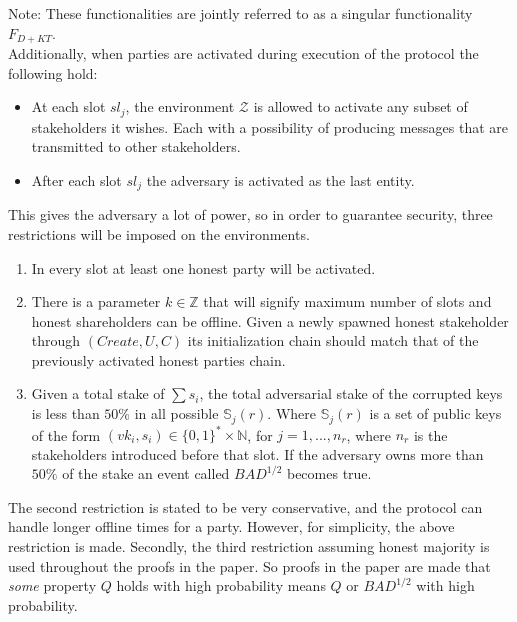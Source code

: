 Note: These functionalities are jointly referred to as a singular functionality $F_{D+KT}$.\\

Additionally, when parties are activated during execution of the protocol the following hold:

\begin{itemize}
    \item At each slot $sl_j$, the environment $\mathcal{Z}$ is allowed to activate any subset of stakeholders it wishes. Each with a possibility of producing messages that are transmitted to other stakeholders. 
    \item After each slot $sl_j$ the adversary is activated as the last entity.
\end{itemize}


This gives the adversary a lot of power, so in order to guarantee security, three restrictions will be imposed on the environments.
\begin{enumerate}
    \item In every slot at least one honest party will be activated.
    \item There is a parameter $k \in \mathbb{Z}$ that will signify maximum number of slots and honest shareholders can be offline. Given a newly spawned honest stakeholder through $(Create, U, C)$ its initialization chain should match that of the previously activated honest parties chain.
    \item Given a total stake of $\sum s_i$, the total adversarial stake of the corrupted keys is less than $50\%$ in all possible $\mathbb{S}_j(r)$. Where $\mathbb{S}_j(r)$ is a set of public keys of the form $(vk_i, s_i) \in \{0,1\}^* \times \mathbb{N}$, for $j=1,...,n_r$, where $n_r$ is the stakeholders introduced before that slot. If the adversary owns more than $50\%$ of the stake an event called $BAD^{1/2}$ becomes true.
\end{enumerate}

The second restriction is stated to be very conservative, and the protocol can handle longer offline times for a party. However, for simplicity, the above restriction is made. Secondly, the third restriction assuming honest majority is used throughout the proofs in the paper. So proofs in the paper are made that \emph{some} property $Q$ holds with high probability means $Q \text{ or } BAD^{1/2}$ with high probability.


